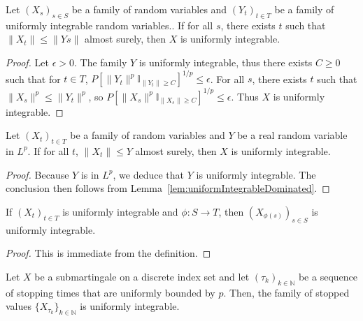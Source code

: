 \begin{lemma}\label{lem:uniformIntegrableDominated}
  \leanok
Let $(X_s)_{s \in S}$ be a family of random variables and $(Y_t)_{t \in T}$ be a family of uniformly integrable random variables.. If for all $s$, there exists $t$ such that $\|X_t\| \le \|Y s\|$ almost surely, then $X$ is uniformly integrable.
\end{lemma}

\begin{proof}
Let $\epsilon > 0$. The family $Y$ is uniformly integrable, thus there exists $C \ge 0$ such that for $t \in T$, $P[\|Y_t\|^p \mathbb{I}_{\|Y_t\| \ge C}]^{1/p} \le \epsilon$. For all $s$, there exists $t$ such that $\|X_s\|^p \le \|Y_t\|^p$, so $P[\|X_s\|^p \mathbb{I}_{\|X_s\| \ge C}]^{1/p} \le \epsilon$. Thus $X$ is uniformly integrable.
\end{proof}

\begin{lemma}\label{lem:uniformIntegrableDominatedSingleton}
  \leanok
Let $(X_t)_{t \in T}$ be a family of random variables and $Y$ be a real random variable in $L^p$. If for all $t$, $\|X_t\| \le Y$ almost surely, then $X$ is uniformly integrable.
\end{lemma}

\begin{proof}
Because $Y$ is in $L^p$, we deduce that ${Y}$ is uniformly integrable. The conclusion then follows from Lemma~\ref{lem:uniformIntegrableDominated}.
\end{proof}

\begin{lemma}\label{lem:uniformIntegrableComp}
  \leanok
If $(X_t)_{t \in T}$ is uniformly integrable and $\phi : S \to T$, then $(X_{\phi(s)})_{s \in S}$ is uniformly integrable.
\end{lemma}

\begin{proof}\leanok
This is immediate from the definition.
\end{proof}

\begin{lemma}\label{lem:uniformIntegrable_stoppedValue_submartingale}
  \leanok
Let $X$ be a submartingale on a discrete index set and let $(\tau_k)_{k \in \mathbb{N}}$ be a sequence of stopping times that are uniformly bounded by $p$.
Then, the family of stopped values $\{X_{\tau_k}\}_{k \in \mathbb{N}}$ is uniformly integrable.
\end{lemma}

